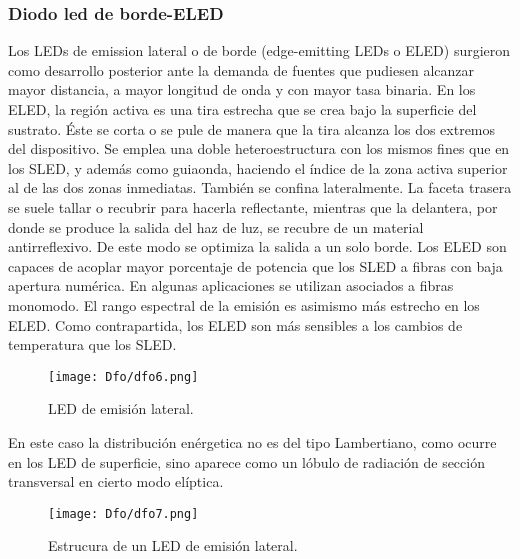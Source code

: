 \documentclass[12pt,fleqn,a4paper,oneside]{LegrandOrangeBook}
\begin{document}
\subsubsection{Diodo led de borde-ELED}
Los LEDs de emission lateral o de borde (edge-emitting LEDs o ELED) surgieron como desarrollo posterior ante la demanda de fuentes que pudiesen alcanzar mayor distancia, a mayor longitud de onda y con mayor tasa binaria. En los ELED, la región activa es una tira estrecha que se crea bajo la superficie del sustrato. Éste se corta o se pule de manera que la tira alcanza los dos extremos del dispositivo. Se emplea una doble heteroestructura con los mismos fines que en los SLED, y además como
guiaonda, haciendo el índice de la zona activa superior al de las dos zonas inmediatas. También se confina lateralmente. La faceta trasera se suele tallar o recubrir para hacerla reflectante, mientras que la delantera, por donde se produce la salida del haz de luz, se recubre de un material antirreflexivo. De este modo se optimiza la salida a un solo borde.
Los ELED son capaces de acoplar mayor porcentaje de potencia que los SLED a fibras con baja apertura numérica. En algunas aplicaciones se utilizan asociados a fibras monomodo. El rango espectral de la emisión es asimismo más estrecho en los ELED. Como contrapartida, los ELED son más sensibles a los cambios de temperatura que los SLED.
\begin{figure}[H]
\centering
\texttt{[image: Dfo/dfo6.png]}
\caption{LED de emisión lateral.}
\end{figure}
En este caso la distribución enérgetica no es del tipo Lambertiano, como ocurre en los LED de superficie, sino aparece como un lóbulo de radiación de sección transversal en cierto modo elíptica.
\begin{figure}[H]
\centering
\texttt{[image: Dfo/dfo7.png]}
\caption{Estrucura de un LED de emisión lateral.}
\end{figure}
\end{document}
